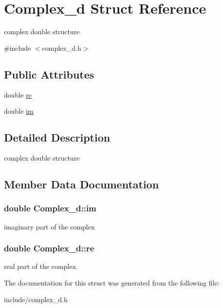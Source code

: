 \hypertarget{structComplex__d}{}\section{Complex\+\_\+d Struct Reference}
\label{structComplex__d}


complex double structure  




{\ttfamily \#include $<$complex\+\_\+d.\+h$>$}

\subsection*{Public Attributes}
\begin{DoxyCompactItemize}
\item 
double \hyperlink{structComplex__d_af793c4b6a0beb61cbc45630aebb9666f}{re}
\item 
double \hyperlink{structComplex__d_ade0f1dbd3f26e1b9ed7aba5df54c707e}{im}
\end{DoxyCompactItemize}


\subsection{Detailed Description}
complex double structure 

\subsection{Member Data Documentation}
\subsubsection[{\texorpdfstring{im}{im}}]{\setlength{\rightskip}{0pt plus 5cm}double Complex\+\_\+d\+::im}\hypertarget{structComplex__d_ade0f1dbd3f26e1b9ed7aba5df54c707e}{}\label{structComplex__d_ade0f1dbd3f26e1b9ed7aba5df54c707e}
imaginary part of the complex 
\subsubsection[{\texorpdfstring{re}{re}}]{\setlength{\rightskip}{0pt plus 5cm}double Complex\+\_\+d\+::re}\hypertarget{structComplex__d_af793c4b6a0beb61cbc45630aebb9666f}{}\label{structComplex__d_af793c4b6a0beb61cbc45630aebb9666f}
real part of the complex. 

The documentation for this struct was generated from the following file\+:\begin{DoxyCompactItemize}
\item 
include/complex\+\_\+d.\+h\end{DoxyCompactItemize}
